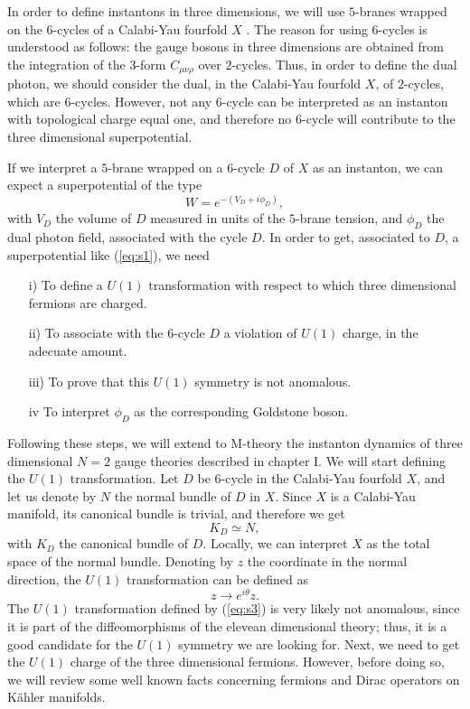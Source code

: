 In order to define instantons in three dimensions, we will use
$5$-branes wrapped on the $6$-cycles of a Calabi-Yau fourfold
$X$ \cite{Wsp}. The reason for using $6$-cycles is understood as follows:
the gauge bosons in three dimensions are obtained from the
integration of the $3$-form $C_{\mu \nu \rho}$ over $2$-cycles.
Thus, in order to define the dual photon, we should consider the
dual, in the Calabi-Yau fourfold $X$, of $2$-cycles, which are
$6$-cycles. However, not any $6$-cycle can be interpreted as an
instanton with topological charge equal one, and therefore no
$6$-cycle will contribute to the three dimensional
superpotential.
  
If we interpret a $5$-brane wrapped on a $6$-cycle $D$ of $X$ as
an instanton, we can expect a superpotential of the type
\begin{equation}
W=e^{-(V_D+i\phi_D)},
\label{eq:s1}
\end{equation}
with $V_D$ the volume of $D$ measured in units of the $5$-brane
tension, and $\phi_D$ the dual photon field, associated with the
cycle $D$. In order to get, associated to $D$, a superpotential
like (\ref{eq:s1}), we need
\begin{itemize}
	\item[{i)}] To define a $U(1)$ transformation with
respect to which three dimensional fermions are charged.
	\item[{ii)}] To associate with the $6$-cycle $D$ a
violation of $U(1)$ charge, in the adecuate amount.
	\item[{iii)}] To prove that this $U(1)$ symmetry is not
anomalous.
	\item[{iv}] To interpret $\phi_D$ as the corresponding
Goldstone boson.
\end{itemize}
  
Following these steps, we will extend to M-theory the instanton
dynamics of three dimensional $N=2$ gauge theories described in
chapter I. We will start defining the $U(1)$ transformation. Let
$D$ be $6$-cycle in the Calabi-Yau fourfold $X$, and let us
denote by $N$ the normal bundle of $D$ in $X$. Since $X$ is a
Calabi-Yau manifold, its canonical bundle is trivial, and
therefore we get
\begin{equation}
K_D \simeq N,
\label{eq:s2}
\end{equation}
with $K_D$ the canonical bundle of $D$. Locally, we can interpret
$X$ as the total space of the normal bundle. Denoting by $z$ the
coordinate in the normal direction, the $U(1)$ transformation can
be defined as
\begin{equation}
z \rightarrow e^{i \theta} z.
\label{eq:s3}
\end{equation}
The $U(1)$ transformation defined by (\ref{eq:s3}) is very likely
not anomalous, since it is part of the diffeomorphisms of the
elevean dimensional theory; thus, it is a good candidate for the
$U(1)$ symmetry we are looking for. Next, we need to get the
$U(1)$ charge of the three dimensional fermions. However, before
doing so, we will review some well known facts concerning
fermions and Dirac operators on K\"ahler manifolds.
  
